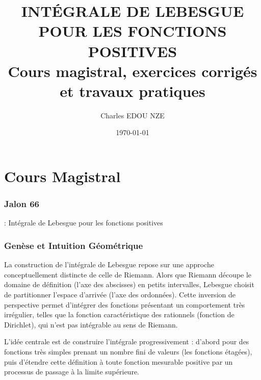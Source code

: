 \documentclass[11pt,a4paper]{article}
\title{\Huge INTÉGRALE DE LEBESGUE POUR LES FONCTIONS POSITIVES \\ \large Cours magistral, exercices corrigés et travaux pratiques}
\author{\Large Charles EDOU NZE}
\date{\today}
\begin{document}
\maketitle
\tableofcontents
\newpage

\part{Cours Magistral}

\section*{Jalon 66} : Intégrale de Lebesgue pour les fonctions positives

\section{Genèse et Intuition Géométrique}

La construction de l'intégrale de Lebesgue repose sur une approche conceptuellement distincte de celle de Riemann. Alors que Riemann découpe le domaine de définition (l'axe des abscisses) en petits intervalles, Lebesgue choisit de partitionner l'espace d'arrivée (l'axe des ordonnées). Cette inversion de perspective permet d'intégrer des fonctions présentant un comportement très irrégulier, telles que la fonction caractéristique des rationnels (fonction de Dirichlet), qui n'est pas intégrable au sens de Riemann.

L'idée centrale est de construire l'intégrale progressivement : d'abord pour des fonctions très simples prenant un nombre fini de valeurs (les fonctions étagées), puis d'étendre cette définition à toute fonction mesurable positive par un processus de passage à la limite supérieure.
\end{document}

